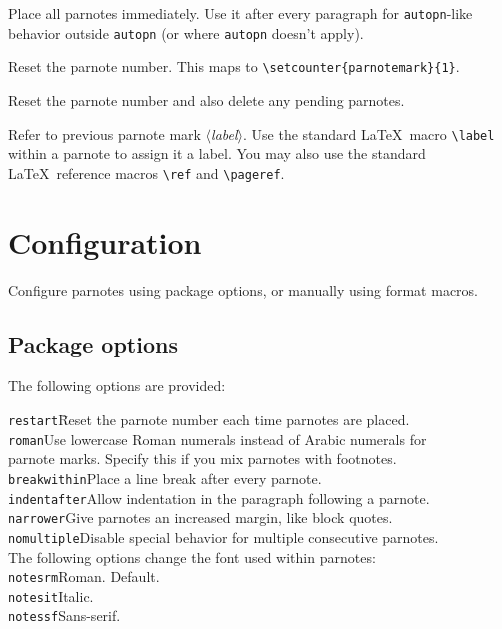 \documentclass[10pt]{article}
\begin{document}
\medskip{}

\medskip\noindent Place all parnotes immediately. Use it after every paragraph for \texttt{autopn}-like behavior outside \texttt{autopn} (or where \texttt{autopn} doesn’t apply).

\medskip{}

\medskip\noindent Reset the parnote number. This maps to \verb+\setcounter{parnotemark}{1}+.

\medskip{}

\medskip\noindent Reset the parnote number and also delete any pending parnotes.

\medskip{}

\medskip\noindent Refer to previous parnote mark $\langle$\textit{label}$\rangle$. Use the standard \LaTeX\ macro \verb+\label+ within a parnote to assign it a label. You may also use the standard \LaTeX\ reference macros \verb+\ref+ and \verb+\pageref+.

\section{Configuration}
Configure \textsf{parnotes} using package options, or manually using format macros.

\subsection{Package options}
The following options are provided:

\noindent\begin{tabbing}
\texttt{restart}\hspace{0.75in}\=Reset the parnote number each time parnotes are placed.\\
\texttt{roman}\>Use lowercase Roman numerals instead of Arabic numerals for\\
\>parnote marks. Specify this if you mix parnotes with footnotes.\\
\texttt{breakwithin}\>Place a line break after every parnote.\\
\texttt{indentafter}\>Allow indentation in the paragraph following a parnote.\\
\texttt{narrower}\>Give parnotes an increased margin, like block quotes.\\
\texttt{nomultiple}\>Disable special behavior for multiple consecutive parnotes.\\[1ex]
The following options change the font used within parnotes:\\[1ex]
\texttt{notesrm}\>Roman. Default.\\
\texttt{notesit}\>Italic.\\
\texttt{notessf}\>Sans-serif.
\end{tabbing}
\end{document}
